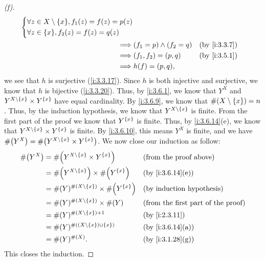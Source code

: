 \begin{proof}[(f)]
\begin{align*}
\begin{dcases}
                 \forall z \in X \setminus \set{x}, f_1(z) = f(z) = p(z) \\
                 \forall z \in \set{x}, f_2(z) = f(z) = q(z)
               \end{dcases}                      \\
    \implies & (f_1 = p) \land (f_2 = q)                                  &  & \by{i:3.3.7} \\
    \implies & (f_1, f_2) = (p, q)                                        &  & \by{i:3.5.1} \\
    \implies & h(f) = (p, q),
  \end{align*}
  we see that \(h\) is surjective (\cref{i:3.3.17}).
  Since \(h\) is both injective and surjective, we know that \(h\) is bijective (\cref{i:3.3.20}).
  Thus, by \cref{i:3.6.1}, we know that \(Y^X\) and \(Y^{X \setminus \left\lbrace x\right\rbrace} \times Y^{\left\lbrace x\right\rbrace}\) have equal cardinality.
  By \cref{i:3.6.9}, we know that \(\#(X \setminus \left\lbrace x\right\rbrace) = n\).
  Thus, by the induction hypothesis, we know that \(Y^{X \setminus \left\lbrace x\right\rbrace}\) is finite.
  From the first part of the proof we know that \(Y^{\left\lbrace x\right\rbrace}\) is finite.
  Thus, by \cref{i:3.6.14}(e), we know that \(Y^{X \setminus \left\lbrace x\right\rbrace} \times Y^{\left\lbrace x\right\rbrace}\) is finite.
  By \cref{i:3.6.10}, this means \(Y^X\) is finite, and we have \(\#\pa{Y^X} = \#\pa{Y^{X \setminus \set{x}} \times Y^{\set{x}}}\).
  We now close our induction as follow:
  \begin{align*}
    \#\pa{Y^X} & = \#\pa{Y^{X \setminus \set{x}} \times Y^{\set{x}}}         &  & \text{(from the proof above)}             \\
               & = \#\pa{Y^{X \setminus \set{x}}} \times \#\pa{Y^{\set{x}}}  &  & \by{i:3.6.14}[e]                          \\
               & = \#(Y)^{\#(X \setminus \set{x})} \times \#\pa{Y^{\set{x}}} &  & \byIH                                     \\
               & = \#(Y)^{\#(X \setminus \set{x})} \times \#(Y)              &  & \text{(from the first part of the proof)} \\
               & = \#(Y)^{\#(X \setminus \set{x}) + 1}                       &  & \by{i:2.3.11}                             \\
               & = \#(Y)^{\#((X \setminus \set{x}) \cup \set{x})}            &  & \by{i:3.6.14}[a]                          \\
               & = \#(Y)^{\#(X)}.                                            &  & \by{i:3.1.28}[g]
  \end{align*}
  This closes the induction.
\end{proof}

